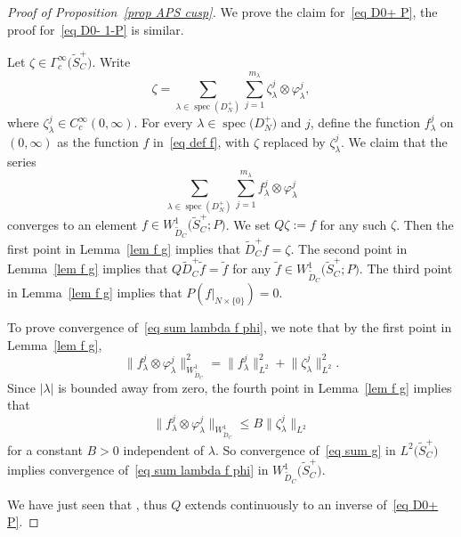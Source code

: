 \documentclass[10pt,a4paper]{amsart}
\numberwithin{equation}{section}
\DeclareMathOperator{\spec}{spec}
\begin{document}
\begin{proof}[Proof of Proposition~\ref{prop APS cusp}]
We prove the claim for~\eqref{eq D0+ P}, the proof for~\eqref{eq D0- 1-P} is similar.

Let $\zeta \in \Gamma^{\infty}_c\big(\widetilde{S}_C^+\big)$. Write
\begin{equation} \label{eq sum g}
\zeta = \sum_{\lambda \in \spec(D_N^+)} \sum_{j=1}^{m_{\lambda}} \zeta_{\lambda}^j \otimes \varphi_{\lambda}^j,
\end{equation}
where $\zeta_{\lambda}^j \in C^{\infty}_c(0,\infty)$. For every $\lambda \in \spec\big(D_N^+\big)$ and $j$, define the function $f_{\lambda}^j$ on $(0,\infty)$ as the function $f$ in~\eqref{eq def f}, with $\zeta$ replaced by $\zeta_{\lambda}^j$. We claim that the series
\begin{equation} \label{eq sum lambda f phi}
 \sum_{\lambda \in \spec(D_N^+)} \sum_{j=1}^{m_{\lambda}} f_{\lambda}^j \otimes \varphi_{\lambda}^j
\end{equation}
converges to an element $f \in W^1_{\widetilde{D}_C}\big(\widetilde{S}_C^+; P\big)$. We set $Q\zeta := f$ for any such $\zeta$.
Then the first point in Lemma~\ref{lem f g} implies that $\widetilde{D}_C^+ f = \zeta$. The second point in Lemma~\ref{lem f g} implies that $Q\widetilde{D}_C^+ \tilde f = \tilde f$ for any $\tilde f \in W^1_{\widetilde{D}_C}\big(\widetilde{S}_C^+; P\big)$.
The third point in Lemma~\ref{lem f g} implies that $P(f|_{N \times \{0\}}) = 0$.

To prove convergence of~\eqref{eq sum lambda f phi}, we note that by the first point in Lemma~\ref{lem f g},
\[
\big\| f_{\lambda}^j \otimes \varphi_{\lambda}^j\big\|_{W^1_{\widetilde{D}_C}}^2 = \big\|f_{\lambda}^j\big\|_{L^2}^2+\big\|\zeta_{\lambda}^j\big\|_{L^2}^2.
\]
Since $|\lambda|$ is bounded away from zero, the fourth point in Lemma~\ref{lem f g} implies that
\begin{equation} \label{eq est flam glam}
\big\| f_{\lambda}^j \otimes \varphi_{\lambda}^j\big\|_{W^1_{\widetilde{D}_C}} \leq B \big\|\zeta_{\lambda}^j\big\|_{L^2}
\end{equation}
for a constant $B>0$ independent of $\lambda$. So convergence of~\eqref{eq sum g} in $L^2\big(\widetilde{S}_C^+\big)$ implies convergence of~\eqref{eq sum lambda f phi} in $W^1_{\widetilde{D}_C}\big(\widetilde{S}_C^+\big)$.

We have just seen that , thus
 $Q$ extends continuously to an inverse of~\eqref{eq D0+ P}.
\end{proof}
\end{document}
